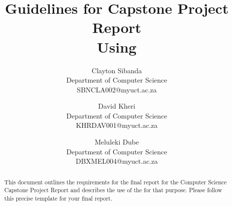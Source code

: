 \documentclass[11pt,a4paper]{article}
\begin{document}
\title{Guidelines for Capstone Project Report\\Using \LaTeXe} \date{}
\author{Clayton Sibanda\\Department of Computer Science\\SBNCLA002@myuct.ac.za
\and David Kheri\\Department of Computer Science\\KHRDAV001@myuct.ac.za
\and Meluleki Dube\\Department of Computer Science\\DBXMEL004@myuct.ac.za}

\chead{}
\lfoot{}
\cfoot{\thepage}    %
\rfoot{}
\renewcommand{\headrulewidth}{0.0pt}   %

\maketitle
\thispagestyle{plain}  %

\begin{abstract}
  This document outlines the requirements for the final report for the
  Computer Science Capstone Project Report and describes the use of
  the \LaTeXe for that purpose. Please follow this precise template
  for your final report.
\end{abstract}













\end{document}
